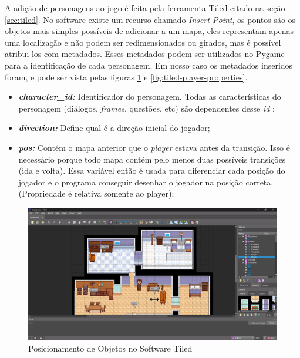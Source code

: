 A adição de personagens ao jogo é feita pela ferramenta Tiled citado na seção \ref{sec:tiled}. No software existe um recurso chamado \textit{Insert Point}, os pontos são os objetos mais simples possíveis de adicionar a um mapa, eles representam apenas uma localização e não podem ser redimensionados ou girados, mas é possível atribui-los com metadados. Esses metadados podem ser utilizados no Pygame para a identificação de cada personagem. Em nosso caso os metadados inseridos foram, e pode ser vista pelas figuras \ref{fig:tiled-house} e \ref{fig:tiled-player-properties}.
\begin{itemize}
    \item \textbf{\textit{character\_id: }} Identificador do personagem. Todas as características do personagem (diálogos, \textit{frames}, questões, etc) são dependentes desse \textit{id} ;
    \item \textbf{\textit{direction: }}Define qual é a direção inicial do jogador;
    \item \textbf{\textit{pos: }} Contém o mapa anterior que o \textit{player} estava antes da transição. Isso é necessário porque todo mapa contém pelo menos duas possíveis transições (ida e volta). Essa variável então é usada para diferenciar cada posição do jogador e o programa conseguir desenhar o jogador na posição correta. (Propriedade é relativa somente ao player);
\end{itemize}

\begin{figure}[h!]
    \centering
    \includegraphics[width=1\linewidth]{figuras/tiled-house.png}
    \caption{Posicionamento de Objetos no Software Tiled }
    \label{fig:tiled-house}
\end{figure}

